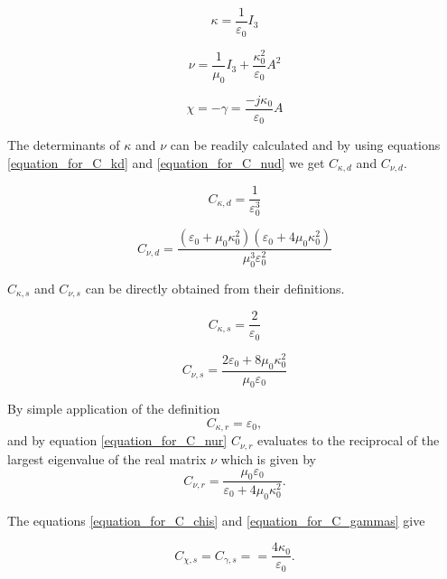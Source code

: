 \begin{equation}
\kappa =\frac{1}{\varepsilon_0}I_3
\end{equation}

\begin{equation}
\nu =\frac{1}{\mu_0}I_3 + \frac{\kappa_0^2}{\varepsilon_0}A^2
\end{equation}

\begin{equation}
\chi = -\gamma = \frac{-j\kappa_0}{\varepsilon_0}A
\end{equation}

The determinants of $\kappa$ and $\nu$ can be readily calculated and by using equations
\eqref{equation_for_C_kd} and \eqref{equation_for_C_nud} we get $C_{\kappa,d}$ and $C_{\nu,d}$.

\begin{equation}
C_{\kappa,d} = \frac{1}{\varepsilon_0^3}
\end{equation}

\begin{equation}
C_{\nu,d} =  \frac{(\varepsilon_0+\mu_0\kappa_0^2)(\varepsilon_0+4\mu_0\kappa_0^2)}{\mu_0^3\varepsilon_0^2}
\end{equation}

$C_{\kappa,s}$ and $C_{\nu,s}$ can be directly obtained from their definitions.

\begin{equation}
C_{\kappa,s} = \frac{2}{\varepsilon_0}
\end{equation}

\begin{equation}
C_{\nu,s} = \frac{2\varepsilon_0 + 8\mu_0\kappa_0^2}{\mu_0\varepsilon_0}
\end{equation}

By simple application of the definition
\begin{equation}
C_{\kappa,r} = \varepsilon_0 ,
\end{equation}
and by equation \eqref{equation_for_C_nur}  $C_{\nu,r}$ evaluates to the reciprocal of the largest 
eigenvalue of the real matrix $\nu$ which is given by
\begin{equation}
C_{\nu,r} =  \frac{\mu_0\varepsilon_0}{\varepsilon_0 + 4 \mu_0\kappa_0^2}.
\end{equation}

The equations  \eqref{equation_for_C_chis} and \eqref{equation_for_C_gammas} give 

\begin{equation}
C_{\chi,s} = C_{\gamma,s}= = \frac{4\kappa_0}{\varepsilon_0}.
\end{equation}

